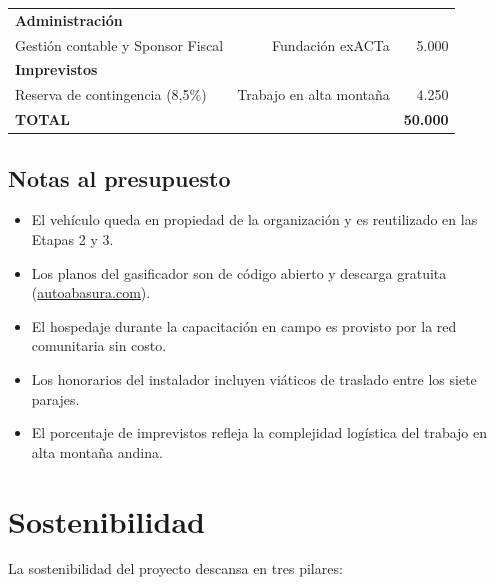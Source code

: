 \documentclass[12pt,a4paper]{article}
\begin{document}
\begin{center}
\begin{longtable}{p{8cm}rr}
\multicolumn{3}{l}{\textbf{Administración}} \\
Gestión contable y Sponsor Fiscal
  & Fundación exACTa & 5.000 \\
\midrule

\multicolumn{3}{l}{\textbf{Imprevistos}} \\
Reserva de contingencia (8,5\%)
  & Trabajo en alta montaña & 4.250 \\
\midrule[\heavyrulewidth]

\multicolumn{2}{l}{\textbf{TOTAL}} & \textbf{50.000} \\

\end{longtable}
\end{center}

\subsection{Notas al presupuesto}

\begin{itemize}
  \item El vehículo queda en propiedad de la organización y es reutilizado en las Etapas 2 y 3.
  \item Los planos del gasificador son de código abierto y descarga gratuita (\href{https://autoabasura.com}{autoabasura.com}).
  \item El hospedaje durante la capacitación en campo es provisto por la red comunitaria sin costo.
  \item Los honorarios del instalador incluyen viáticos de traslado entre los siete parajes.
  \item El porcentaje de imprevistos refleja la complejidad logística del trabajo en alta montaña andina.
\end{itemize}

\section{Sostenibilidad}

La sostenibilidad del proyecto descansa en tres pilares:
\end{document}
